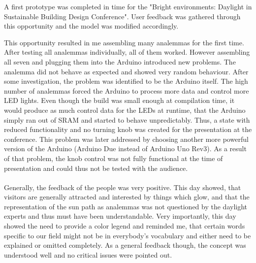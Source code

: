 \documentclass[a4paper,9pt]{article}
\begin{document}
  A first prototype was completed in time for the "Bright environments: Daylight in Sustainable Building Design Conference". User feedback was gathered through this opportunity and the model was modified accordingly.
 \begin{multicols}{2}
  This opportunity resulted in me assembling many analemmas for the first time. After testing all analemmas individually, all of them worked. However assembling all seven and plugging them into the Arduino introduced new problems. The analemma did not behave as expected and showed very random behaviour. After some investigation, the problem was identified to be the Arduino itself. The high number of analemmas forced the Arduino to process more data and control more LED lights. Even though the build was small enough at compilation time, it would produce as much control data for the LEDs at runtime, that the Arduino simply ran out of SRAM and started to behave unpredictably. Thus, a state with reduced functionality and no turning knob was created for the presentation at the conference. This problem was later addressed by choosing another more powerful version of the Arduino
  \columnbreak
  (Arduino Due instead of Arduino Uno Rev3). As a result of that problem, the knob control was not fully functional at the time of presentation and could thus not be tested with the audience.\\
  \\
  Generally, the feedback of the people was very positive. This day showed, that visitors are generally attracted and interested by things which glow, and that the representation of the sun path as analemmas was not questioned by the daylight experts and thus must have been understandable. Very importantly, this day showed the need to provide a color legend and reminded me, that certain words specific to our field might not be in everybody's vocabulary and either need to be explained or omitted completely. As a general feedback though, the concept was understood well and no critical issues were pointed out.\\  
\end{multicols}
\end{document}
